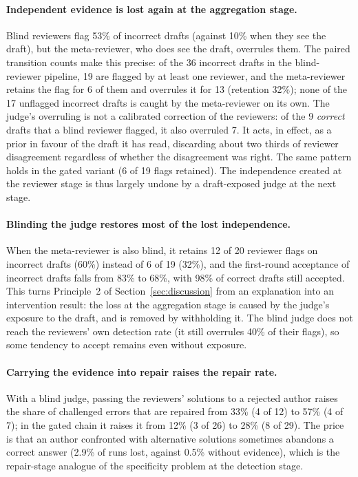 \paragraph{Independent evidence is lost again at the aggregation stage.}
Blind reviewers flag 53\% of incorrect drafts (against 10\% when they see the draft), but the meta-reviewer, who does see the draft, overrules them.
The paired transition counts make this precise: of the 36 incorrect drafts in the blind-reviewer pipeline, 19 are flagged by at least one reviewer, and the meta-reviewer retains the flag for 6 of them and overrules it for 13 (retention 32\%); none of the 17 unflagged incorrect drafts is caught by the meta-reviewer on its own.
The judge's overruling is not a calibrated correction of the reviewers: of the 9 \emph{correct} drafts that a blind reviewer flagged, it also overruled 7.
It acts, in effect, as a prior in favour of the draft it has read, discarding about two thirds of reviewer disagreement regardless of whether the disagreement was right.
The same pattern holds in the gated variant (6 of 19 flags retained).
The independence created at the reviewer stage is thus largely undone by a draft-exposed judge at the next stage.

\paragraph{Blinding the judge restores most of the lost independence.}
When the meta-reviewer is also blind, it retains 12 of 20 reviewer flags on incorrect drafts (60\%) instead of 6 of 19 (32\%), and the first-round acceptance of incorrect drafts falls from 83\% to 68\%, with 98\% of correct drafts still accepted.
This turns Principle~2 of Section~\ref{sec:discussion} from an explanation into an intervention result: the loss at the aggregation stage is caused by the judge's exposure to the draft, and is removed by withholding it.
The blind judge does not reach the reviewers' own detection rate (it still overrules 40\% of their flags), so some tendency to accept remains even without exposure.

\paragraph{Carrying the evidence into repair raises the repair rate.}
With a blind judge, passing the reviewers' solutions to a rejected author raises the share of challenged errors that are repaired from 33\% (4 of 12) to 57\% (4 of 7); in the gated chain it raises it from 12\% (3 of 26) to 28\% (8 of 29).
The price is that an author confronted with alternative solutions sometimes abandons a correct answer (2.9\% of runs lost, against 0.5\% without evidence), which is the repair-stage analogue of the specificity problem at the detection stage.

